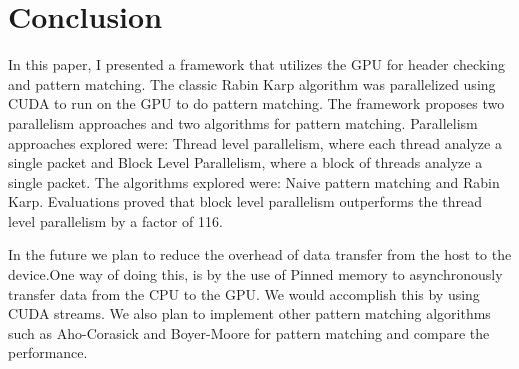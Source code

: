 \chapter{Conclusion}

In this paper, I presented a framework that utilizes the GPU for header checking and pattern matching. The classic Rabin Karp algorithm was parallelized using CUDA to run on the GPU to do pattern matching. The framework proposes two parallelism approaches and two algorithms for pattern matching. Parallelism approaches explored were: Thread level parallelism,  where each thread analyze a single packet and Block Level Parallelism, where a block of threads analyze a single packet. The algorithms explored were: Naive pattern matching and Rabin Karp. Evaluations proved that block level parallelism outperforms the thread level parallelism by a factor of 116.

In the future we plan to reduce the overhead of data transfer from the host to the device.One way of doing this, is by the use of Pinned memory to asynchronously transfer data from the CPU to the GPU. We would accomplish this by using CUDA streams. We also plan to implement other pattern matching algorithms such as Aho-Corasick and Boyer-Moore for pattern matching and compare the performance. 

